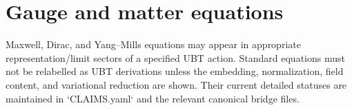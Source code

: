 \documentclass[11pt,a4paper]{article}
\begin{document}
\section{Gauge and matter equations}

Maxwell, Dirac, and Yang--Mills equations may appear in appropriate
representation/limit sectors of a specified UBT action.  Standard equations
must not be relabelled as UBT derivations unless the embedding, normalization,
field content, and variational reduction are shown.  Their current detailed
statuses are maintained in `CLAIMS.yaml` and the relevant canonical bridge
files.
\end{document}
